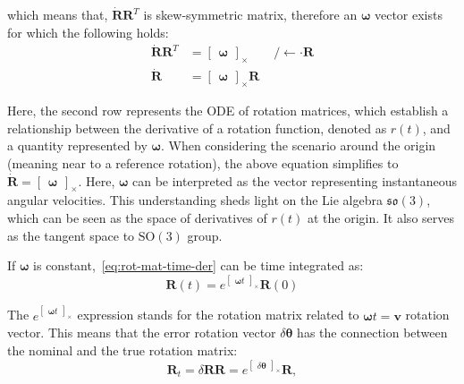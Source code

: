 which means that, $\dot{\mathbf{R}}\mathbf{R}^T$ is skew-symmetric matrix, therefore an $\boldsymbol{\omega}$ vector exists for which the following holds:
\begin{equation}
\begin{aligned}
    \dot{\mathbf{R}}\mathbf{R}^T&=\begin{bmatrix}\boldsymbol{\omega}\end{bmatrix}_\times \qquad /\leftarrow\cdot\mathbf{R} \\
     \dot{\mathbf{R}}&=\begin{bmatrix}\boldsymbol{\omega}\end{bmatrix}_\times\mathbf{R}
\end{aligned}
\label{eq:rot-mat-time-der}
\end{equation}

Here, the second row represents the ODE of rotation matrices, which establish a relationship between the derivative of a rotation function, denoted as $r(t)$, and a quantity represented by $\boldsymbol{\omega}$. When considering the scenario around the origin (meaning near to a reference rotation), the above equation simplifies to $\dot{\mathbf{R}}=\begin{bmatrix} \boldsymbol{\omega} \end{bmatrix}_\times$. Here, $\boldsymbol{\omega}$ can be interpreted as the vector representing instantaneous angular velocities. This understanding sheds light on the Lie algebra $\mathfrak{so}(3)$, which can be seen as the space of derivatives of $r(t)$ at the origin. It also serves as the tangent space to $\mathrm{SO}(3)$ group.

If $\boldsymbol{\omega}$ is constant,~\eqref{eq:rot-mat-time-der} can be time integrated as:
\begin{equation}
    \mathbf{R}(t)=e^{\begin{bmatrix} \boldsymbol{\omega}t \end{bmatrix}_\times}\mathbf{R}(0)
\end{equation}

The $e^{\begin{bmatrix} \boldsymbol{\omega}t \end{bmatrix}_\times}$ expression stands for the rotation matrix related to $\boldsymbol{\omega}t=\mathbf{v}$ rotation vector. This means that the error rotation vector $\delta\boldsymbol{\theta}$ has the connection between the nominal and the true rotation matrix:
\begin{equation}
    \mathbf{R}_t=\delta\mathbf{R}\mathbf{R}=e^{\begin{bmatrix}\delta\boldsymbol{\theta}\end{bmatrix}_\times}\mathbf{R},
\end{equation}

